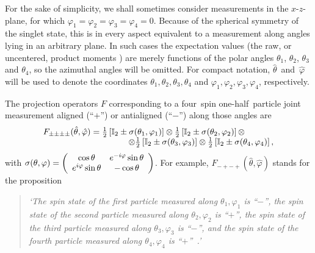 \documentclass[rmp,amsfonts,showpacs,showkeys,preprint]{revtex4}
\begin{document}
For the sake of simplicity, we shall sometimes consider measurements
in the $x$-$z$-plane, for which $\varphi_1=\varphi_2=\varphi_3=\varphi_4=0$.
Because of the spherical symmetry of the singlet state, this is in every aspect
equivalent to a measurement along angles lying in an arbitrary plane.
In such cases the expectation values (the raw, or uncentered,
product moments \cite{gill-03}) are merely functions of the polar angles
$\theta_1 $,
$\theta_2 $,
$\theta_3 $ and
$\theta_4 $,
so the azimuthal angles will be omitted.
For compact notation,
${\hat \theta}$~and~${\hat \varphi}$ will be used to denote the coordinates
$\theta_1 ,\theta_2 ,\theta_3 ,\theta_4$ and
$\varphi_1 ,\varphi_2 ,\varphi_3 ,\varphi_4$,
respectively.


The projection operators $F$
corresponding to a four~spin one-half~particle joint measurement
aligned (``$+$'') or antialigned  (``$-$'') along those angles are
\begin{equation}
\begin{array}{lll}
 F_{\pm \pm \pm \pm} ({\hat \theta},{\hat \varphi} ) =
{\frac{1}{2}}\left[{\mathbb I}_2 \pm {\bf \sigma}( \theta_1,\varphi_1 )\right]
\otimes
{\frac{1}{2}}\left[{\mathbb I}_2 \pm {\bf \sigma}( \theta_2,\varphi_2 )\right] \otimes
\nonumber\\
\qquad\qquad\qquad\qquad\qquad
\otimes
{\frac{1}{2}}\left[{\mathbb I}_2 \pm {\bf \sigma}( \theta_3,\varphi_3 )\right]
\otimes
{\frac{1}{2}}\left[{\mathbb I}_2 \pm {\bf \sigma}( \theta_4,\varphi_4 )\right],
\end{array}
\label{2004-gtq-e2}
\end{equation}
with
$
{\bf \sigma}( \theta ,\varphi )=
\left(
\begin{array}{cc} \cos \theta  &e^{-i\varphi} \sin \theta   \\
  e^{i\varphi}\sin \theta  & -\cos \theta
  \end{array}
\right)
$.
For example, $F_{- + - + } ({\hat \theta},{\hat \varphi} )$ stands for the proposition
\begin{quote}
{\em `The spin state of the first particle measured along $\theta_1,\varphi_1$ is ``$-$'',
      the spin state of the second particle measured along $\theta_2,\varphi_2$ is ``$+$'',
      the spin state of the third particle measured along $\theta_3,\varphi_3$ is ``$-$'',
      and the spin state of the fourth particle measured along $\theta_4,\varphi_4$ is ``$+$''~.'
}
\end{quote}
\end{document}
